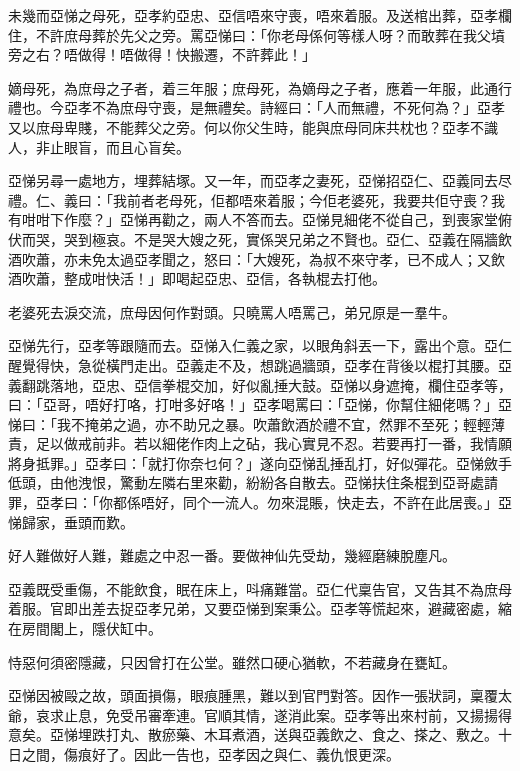 \documentclass[a5paper, 12pt, openany]{book} %
\begin{document}
	未幾而亞悌之母死，亞孝約亞忠、亞信唔來守喪，唔來着服。及送棺出葬，亞孝欄住，不許庶母葬於先父之旁。罵亞悌曰：「你老母係何等樣人呀？而敢葬在我父墳旁之右？唔做得！唔做得！快搬遷，不許葬此！」

	嫡母死，為庶母之子者，着三年服；庶母死，為嫡母之子者，應着一年服，此通行禮也。今亞孝不為庶母守喪，是無禮矣。詩經曰：「人而無禮，不死何為？」亞孝又以庶母卑賤，不能葬父之旁。何以你父生時，能與庶母同床共枕也？亞孝不識人，非止眼盲，而且心盲矣。

	亞悌另尋一處地方，埋葬結塚。又一年，而亞孝之妻死，亞悌招亞仁、亞義同去尽禮。仁、義曰：「我前者老母死，佢都唔來着服；今佢老婆死，我要共佢守喪？我有咁咁下作麼？」亞悌再勸之，兩人不答而去。亞悌見細佬不從自己，到喪家堂俯伏而哭，哭到極哀。不是哭大嫂之死，實係哭兄弟之不賢也。亞仁、亞義在隔牆飲酒吹蕭，亦未免太過亞孝聞之，怒曰：「大嫂死，為叔不來守孝，已不成人；又飲酒吹蕭，整成咁快活！」即喝起亞忠、亞信，各執棍去打他。

	老婆死去淚交流，庶母因何作對頭。只曉罵人唔罵己，弟兄原是一羣牛。

	亞悌先行，亞孝等跟隨而去。亞悌入仁義之家，以眼角斜丟一下，露出个意。亞仁醒覺得快，急從橫門走出。亞義走不及，想跳過牆頭，亞孝在背後以棍打其腰。亞義翻跳落地，亞忠、亞信拳棍交加，好似亂捶大鼓。亞悌以身遮掩，欄住亞孝等，曰：「亞哥，唔好打咯，打咁多好咯！」亞孝喝罵曰：「亞悌，你幫住細佬嗎？」亞悌曰：「我不掩弟之過，亦不助兄之暴。吹蕭飲酒於禮不宜，然罪不至死；輕輕薄責，足以做戒前非。若以細佬作肉上之砧，我心實見不忍。若要再打一番，我情願將身抵罪。」亞孝曰：「就打你奈乜何？」遂向亞悌乱捶乱打，好似彈花。亞悌斂手低頭，由他洩恨，驚動左隣右里來勸，紛紛各自散去。亞悌扶住条棍到亞哥處請罪，亞孝曰：「你都係唔好，同个一流人。勿來混賬，快走去，不許在此居喪。」亞悌歸家，垂頭而歎。

	好人難做好人難，難處之中忍一番。要做神仙先受劫，幾經磨練脫塵凡。

	亞義既受重傷，不能飲食，眠在床上，呌痛難當。亞仁代稟告官，又告其不為庶母着服。官即出差去捉亞孝兄弟，又要亞悌到案秉公。亞孝等慌起來，避藏密處，縮在房間閣上，隱伏缸中。

	恃惡何須密隱藏，只因曾打在公堂。雖然口硬心猶軟，不若藏身在甕缸。

	亞悌因被毆之故，頭面損傷，眼痕腫黑，難以到官門對答。因作一張狀詞，稟覆太爺，哀求止息，免受吊審牽連。官順其情，遂消此案。亞孝等出來村前，又揚揚得意矣。亞悌埋跌打丸、散瘀藥、木耳煮酒，送與亞義飲之、食之、搽之、敷之。十日之間，傷痕好了。因此一告也，亞孝因之與仁、義仇恨更深。
\end{document}

